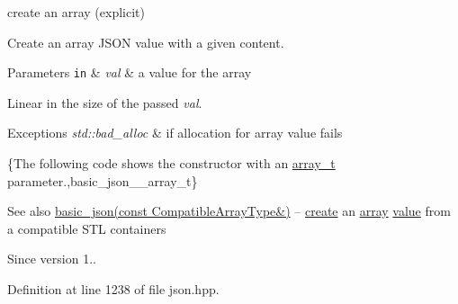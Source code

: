 create an array (explicit) 

Create an array J\+S\+O\+N value with a given content.


\begin{DoxyParams}[1]{Parameters}
\mbox{\tt in}  & {\em val} & a value for the array\\
\hline
\end{DoxyParams}
Linear in the size of the passed {\itshape val}.


\begin{DoxyExceptions}{Exceptions}
{\em std\+::bad\+\_\+alloc} & if allocation for array value fails\\
\hline
\end{DoxyExceptions}
\{The following code shows the constructor with an \hyperlink{classnlohmann_1_1basic__json_ab00b882d39306d663c23dab110f5cae0}{array\+\_\+t} parameter.,basic\+\_\+json\+\_\+\+\_\+array\+\_\+t\}

\begin{DoxySeeAlso}{See also}
\hyperlink{classnlohmann_1_1basic__json_a81aaaab0f3b326afda2d226daab4f1e1}{basic\+\_\+json(const Compatible\+Array\+Type\&)} -- \hyperlink{classnlohmann_1_1basic__json_a27df4303fbc83071275074486b54a40e}{create} an \hyperlink{classnlohmann_1_1basic__json_a5685815624b086caa532f41e853d4b0f}{array} \hyperlink{classnlohmann_1_1basic__json_a0a2cbbd95862a623e7dc5c37e67dead0}{value} from a compatible S\+T\+L containers
\end{DoxySeeAlso}
\begin{DoxySince}{Since}
version 1.. 
\end{DoxySince}


Definition at line 1238 of file json.\+hpp.

\hypertarget{classnlohmann_1_1basic__json_a81aaaab0f3b326afda2d226daab4f1e1}{}
